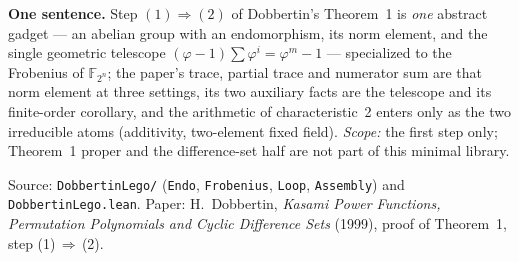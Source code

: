 \documentclass[11pt]{article}
\newcommand{\lc}[1]{\texttt{\small #1}}
\newcommand{\phiop}{\varphi}
\begin{document}
\begin{note}
\textbf{One sentence.} Step $(1)\Rightarrow(2)$ of Dobbertin's Theorem~1 is
\emph{one} abstract gadget --- an abelian group with an endomorphism, its norm
element, and the single geometric telescope $(\phiop{-}1)\sum\phiop^i=\phiop^m{-}1$
--- specialized to the Frobenius of $\mathbb{F}_{2^n}$; the paper's trace, partial
trace and numerator sum are that norm element at three settings, its two auxiliary
facts are the telescope and its finite-order corollary, and the arithmetic of
characteristic~2 enters only as the two irreducible atoms (additivity, two-element
fixed field). \emph{Scope:} the first step only; Theorem~1 proper and the
difference-set half are not part of this minimal library.
\end{note}

\bigskip
\begin{center}\scriptsize
Source: \lc{DobbertinLego/} (\lc{Endo}, \lc{Frobenius}, \lc{Loop}, \lc{Assembly})
and \lc{DobbertinLego.lean}. Paper: H.~Dobbertin, \emph{Kasami Power Functions,
Permutation Polynomials and Cyclic Difference Sets} (1999), proof of Theorem~1,
step (1)\,$\Rightarrow$\,(2).
\end{center}
\end{document}
